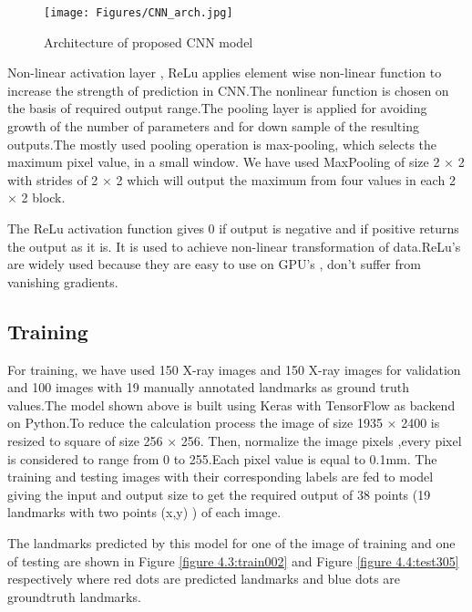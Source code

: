 \documentclass[sn-mathphys]{sn-jnl}%
\theoremstyle{thmstyleone}%
\theoremstyle{thmstyletwo}%
\theoremstyle{thmstylethree}%
\begin{document}
\begin{figure}[htp]
    \centering
    \texttt{[image: Figures/CNN\_arch.jpg]}
    \caption{Architecture of proposed CNN model}
    \label{figure 4.2:CNN_arch}
\end{figure} 

 
 \par Non-linear activation layer , ReLu applies element wise non-linear function to increase the strength of prediction in CNN.The nonlinear function is chosen  on the basis of required output range.The pooling layer is applied for avoiding growth of the number of parameters and for down sample of the resulting outputs.The mostly used pooling operation is max-pooling, which selects the maximum pixel value, in a small window. We have used MaxPooling of size 2 × 2 with strides of 2 × 2 which will output the maximum from four values in each 2 × 2 block. 
 
 \par The ReLu activation function gives 0 if output is negative and if positive returns the output as it is. It is used to achieve non-linear transformation of data.ReLu's are widely used because they are easy to use on GPU's , don't suffer from vanishing gradients.
 
 
 
 \subsection{Training}
For training, we have used 150 X-ray images and 150 X-ray images for validation and 100 images  with 19 manually annotated landmarks as ground truth values.The model shown above is built using Keras with TensorFlow as backend on Python.To reduce the calculation process the image of size 1935 × 2400 is resized to square of size 256 × 256. Then, normalize the image pixels ,every pixel is considered to range from 0 to 255.Each pixel value is equal to 0.1mm. The training and testing images with their corresponding labels are fed to model giving the input and output size to get the required output of 38 points (19 landmarks with two points (x,y) ) of each image.
 
The landmarks predicted by this model for one of the image of training and one of testing are shown in Figure \ref{figure 4.3:train002} and Figure \ref{figure 4.4:test305} respectively where red dots are predicted landmarks and blue dots are groundtruth landmarks.
\end{document}
